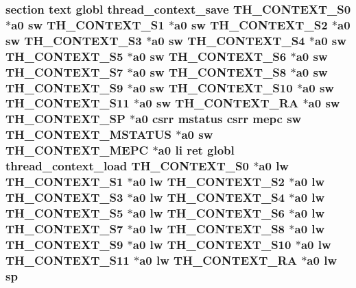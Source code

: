 \hypertarget{riscv_2kpanica_8S_ab6ec0e135d1a07114832310b5ceb21b3}{
\subsubsection[{sp}]{\setlength{\rightskip}{0pt plus 5cm}section text globl {\bf thread\-\_\-context\-\_\-save} {\bf T\-H\-\_\-\-C\-O\-N\-T\-E\-X\-T\-\_\-\-S0} $\ast${\bf a0} {\bf sw} {\bf T\-H\-\_\-\-C\-O\-N\-T\-E\-X\-T\-\_\-\-S1} $\ast${\bf a0} {\bf sw} {\bf T\-H\-\_\-\-C\-O\-N\-T\-E\-X\-T\-\_\-\-S2} $\ast${\bf a0} {\bf sw} {\bf T\-H\-\_\-\-C\-O\-N\-T\-E\-X\-T\-\_\-\-S3} $\ast${\bf a0} {\bf sw} {\bf T\-H\-\_\-\-C\-O\-N\-T\-E\-X\-T\-\_\-\-S4} $\ast${\bf a0} {\bf sw} {\bf T\-H\-\_\-\-C\-O\-N\-T\-E\-X\-T\-\_\-\-S5} $\ast${\bf a0} {\bf sw} {\bf T\-H\-\_\-\-C\-O\-N\-T\-E\-X\-T\-\_\-\-S6} $\ast${\bf a0} {\bf sw} {\bf T\-H\-\_\-\-C\-O\-N\-T\-E\-X\-T\-\_\-\-S7} $\ast${\bf a0} {\bf sw} {\bf T\-H\-\_\-\-C\-O\-N\-T\-E\-X\-T\-\_\-\-S8} $\ast${\bf a0} {\bf sw} {\bf T\-H\-\_\-\-C\-O\-N\-T\-E\-X\-T\-\_\-\-S9} $\ast${\bf a0} {\bf sw} {\bf T\-H\-\_\-\-C\-O\-N\-T\-E\-X\-T\-\_\-\-S10} $\ast${\bf a0} {\bf sw} {\bf T\-H\-\_\-\-C\-O\-N\-T\-E\-X\-T\-\_\-\-S11} $\ast${\bf a0} {\bf sw} {\bf T\-H\-\_\-\-C\-O\-N\-T\-E\-X\-T\-\_\-\-R\-A} $\ast${\bf a0} {\bf sw} {\bf T\-H\-\_\-\-C\-O\-N\-T\-E\-X\-T\-\_\-\-S\-P} $\ast${\bf a0} csrr {\bf mstatus} csrr {\bf mepc} {\bf sw} {\bf T\-H\-\_\-\-C\-O\-N\-T\-E\-X\-T\-\_\-\-M\-S\-T\-A\-T\-U\-S} $\ast${\bf a0} {\bf sw} {\bf T\-H\-\_\-\-C\-O\-N\-T\-E\-X\-T\-\_\-\-M\-E\-P\-C} $\ast${\bf a0} {\bf li} ret globl {\bf thread\-\_\-context\-\_\-load} {\bf T\-H\-\_\-\-C\-O\-N\-T\-E\-X\-T\-\_\-\-S0} $\ast${\bf a0} {\bf lw} {\bf T\-H\-\_\-\-C\-O\-N\-T\-E\-X\-T\-\_\-\-S1} $\ast${\bf a0} {\bf lw} {\bf T\-H\-\_\-\-C\-O\-N\-T\-E\-X\-T\-\_\-\-S2} $\ast${\bf a0} {\bf lw} {\bf T\-H\-\_\-\-C\-O\-N\-T\-E\-X\-T\-\_\-\-S3} $\ast${\bf a0} {\bf lw} {\bf T\-H\-\_\-\-C\-O\-N\-T\-E\-X\-T\-\_\-\-S4} $\ast${\bf a0} {\bf lw} {\bf T\-H\-\_\-\-C\-O\-N\-T\-E\-X\-T\-\_\-\-S5} $\ast${\bf a0} {\bf lw} {\bf T\-H\-\_\-\-C\-O\-N\-T\-E\-X\-T\-\_\-\-S6} $\ast${\bf a0} {\bf lw} {\bf T\-H\-\_\-\-C\-O\-N\-T\-E\-X\-T\-\_\-\-S7} $\ast${\bf a0} {\bf lw} {\bf T\-H\-\_\-\-C\-O\-N\-T\-E\-X\-T\-\_\-\-S8} $\ast${\bf a0} {\bf lw} {\bf T\-H\-\_\-\-C\-O\-N\-T\-E\-X\-T\-\_\-\-S9} $\ast${\bf a0} {\bf lw} {\bf T\-H\-\_\-\-C\-O\-N\-T\-E\-X\-T\-\_\-\-S10} $\ast${\bf a0} {\bf lw} {\bf T\-H\-\_\-\-C\-O\-N\-T\-E\-X\-T\-\_\-\-S11} $\ast${\bf a0} {\bf lw} {\bf T\-H\-\_\-\-C\-O\-N\-T\-E\-X\-T\-\_\-\-R\-A} $\ast${\bf a0} {\bf lw} sp}}\label{riscv_2kpanica_8S_ab6ec0e135d1a07114832310b5ceb21b3}
